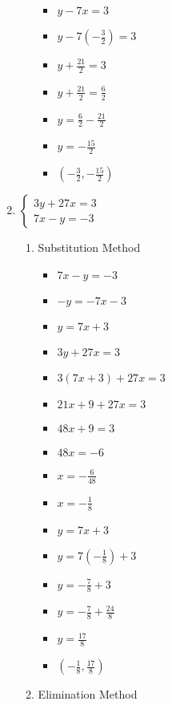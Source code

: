 \begin{enumerate}
\begin{enumerate}
\begin{itemize}
    \item $y-7x=3$
    \item {\Large $y-7\left(-\frac{3}{2}\right)=3$}
    \item {\Large $y+\frac{21}{2}=3$}
    \item {\Large $y+\frac{21}{2}=\frac{6}{2}$}
    \item {\Large $y=\frac{6}{2}-\frac{21}{2}$}
    \item {\Large $y=-\frac{15}{2}$}
    \item {\Large $\left(-\frac{3}{2},-\frac{15}{2}\right)$}
    \end{itemize}
  \end{enumerate}
\item $\left\{ \begin{array}{l}
      3y+27x=3 \\
      7x-y=-3 \end{array} \right.$
  \begin{enumerate}
  \item Substitution Method
    \begin{itemize}
    \item $7x-y=-3$
    \item $-y=-7x-3$
    \item $y=7x+3$
    \item $3y+27x=3$
    \item $3(7x+3)+27x=3$
    \item $21x+9+27x=3$
    \item $48x+9=3$
    \item $48x=-6$
    \item {\Large $x=-\frac{6}{48}$}
    \item {\Large $x=-\frac{1}{8}$}
    \item $y=7x+3$
    \item {\Large $y=7\left(-\frac{1}{8}\right)+3$}
    \item {\Large $y=-\frac{7}{8}+3$}
    \item {\Large $y=-\frac{7}{8}+\frac{24}{8}$}
    \item {\Large $y=\frac{17}{8}$}
    \item {\Large $\left(-\frac{1}{8},\frac{17}{8}\right)$}
    \end{itemize}
  \item Elimination Method
\end{enumerate}
\end{enumerate}
